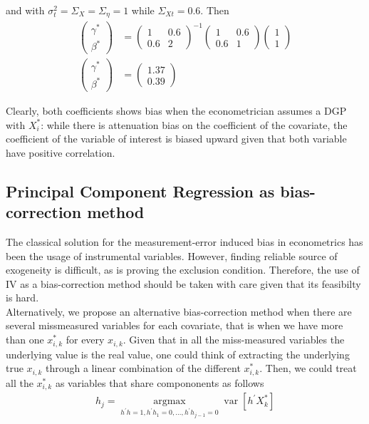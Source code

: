 \documentclass[12pt]{article}
\begin{document}
and with $\sigma^2_t=\Sigma_X=\Sigma_\eta=1$ while $\Sigma_{Xt}=0.6$. Then
\begin{align*}
    \left(\begin{array}{l}
{\gamma}^* \\
{\beta}^*
\end{array}\right)& =\left(\begin{array}{cc}
1 & 0.6 \\
0.6 & 2
\end{array}\right)^{-1}\left(\begin{array}{cc}
1 & 0.6 \\
0.6 & 1
\end{array}\right)\left(\begin{array}{l}
1\\
1
\end{array}\right) \\
\left(\begin{array}{l}
{\gamma}^* \\
{\beta}^*
\end{array}\right)&=\left(\begin{array}{l}
1.37 \\
0.39
\end{array}\right)
\end{align*}

Clearly, both coefficients shows bias when the econometrician assumes a DGP with $X_i^*$: while there is attenuation bias on the coefficient of the covariate, the coefficient of the variable of interest is biased upward given that both variable have positive correlation.

\subsection*{Principal Component Regression as bias-correction method}

The classical solution for the measurement-error induced bias in econometrics has been the usage of instrumental variables. However, finding reliable source of exogeneity is difficult, as is proving the exclusion condition. Therefore, the use of IV as a bias-correction method should be taken with care given that its feasibilty is hard.\\

Alternatively, we propose an alternative bias-correction method when there are several missmeasured variables for each covariate, that is when we have more than one $x_{i,k}^*$ for every $x_{i,k}$. Given that in all the miss-measured variables the underlying value is the real value, one could think of extracting the underlying true $x_{i,k}$ through a linear combination of the different $x_{i,k}^*$. Then, we could treat all the $x_{i,k}^*$ as variables that share compononents as follows
\begin{align}
   h_{j}=\underset{h^{\prime} h=1, h^{\prime} h_{1}=0, \ldots, h^{\prime} h_{j-1}=0}{\operatorname{argmax}} \operatorname{var}\left[h^{\prime} X^*_k\right]  
\end{align}
\end{document}
